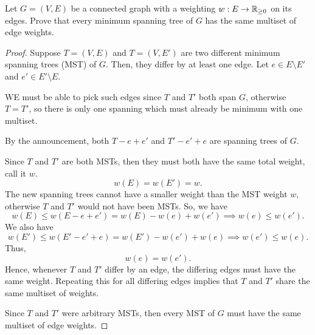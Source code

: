 \documentclass[../hw5]{subfiles}
\begin{document}
\begin{problem}
Let $G = (V,E)$ be a connected graph with a weighting $w : E \to \mathbb R_{\ge 0}$ on its edges. Prove that every minimum spanning tree of $G$ has the same multiset of edge weights.
\end{problem}
\begin{proof}
	Suppose $T=(V,E)$ and  $T=(V,E')$ are two different minimum spanning trees (MST) of $G$.
	Then, they differ by at least one edge.
	Let  $e\in E\setminus E'$ and $e'\in E'\setminus E$.

	WE must be able to pick such edges since $T$ and  $T'$ both span  $G$,
	otherwise $T=T'$, so there is only one spanning which must already be minimum with one multiset.

	By the announcement, both $T-e+e'$ and  $T'-e'+e$ are spanning trees of  $G$.

	Since  $T$ and $T'$ are both MSTs, then they must both have the same total weight, call it  $w$.  \[
		w(E)=w(E')=w
		.\]
	The new spanning trees cannot have a smaller weight than the MST weight $w$, otherwise $T$ and  $T'$ would not have been MSTs.
	So, we have  \[
		w(E)\le w(E-e+e')=w(E)-w(e)+w(e')\implies w(e)\le w(e')
		.\]
	We also have \[
		w(E')\le w(E'-e'+e)=w(E')-w(e')+w(e)\implies w(e')\le w(e)
		.\]
	Thus,  \[
		w(e)=w(e')
		.\]
	Hence, whenever $T$ and  $T'$ differ by an edge, the differing edges must have the same weight.
	Repeating this for all differing edges implies that  $T$ and  $T'$ share the same multiset of weights.

	Since  $T$ and  $T'$ were arbitrary MSTs, then every MST of  $G$ must have the same multiset of edge weights.
\end{proof}
\end{document}
